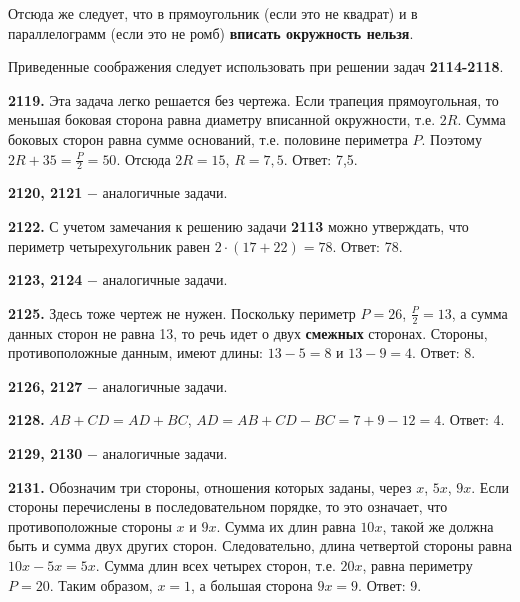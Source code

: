 Отсюда же следует, что в прямоугольник (если это не квадрат) и в параллелограмм (если это не ромб) \textbf{вписать окружность нельзя}.  

Приведенные соображения следует использовать при решении задач \textbf{2114-2118}.

\textbf{2119.} Эта задача легко решается без чертежа. Если трапеция прямоугольная, то меньшая боковая сторона равна диаметру вписанной окружности, т.е. $2R$. Сумма боковых сторон равна сумме оснований, т.е. половине периметра $P$. Поэтому $2R+35=\frac{P}{2}=50$. Отсюда $2R=15$, $R=7,5$. \newline \null \hspace*{\fill} Ответ: 7,5.

\textbf{2120, 2121} $-$ аналогичные задачи.

\textbf{2122.} С учетом замечания к решению задачи \textbf{2113} можно утверждать, что периметр четырехугольник равен $2\cdot(17+22)=78$. \newline \null \hspace*{\fill} Ответ: 78.

\textbf{2123, 2124} $-$ аналогичные задачи.

\textbf{2125.} Здесь тоже чертеж не нужен. Поскольку периметр $P=26$, $\frac{P}{2}=13$, а сумма данных сторон не равна 13, то речь идет о двух \textbf{смежных} сторонах. Стороны, противоположные данным, \clearpage имеют длины: $13-5=8$ и $13-9=4$. \newline \null \hspace*{\fill} Ответ: 8.

\textbf{2126, 2127} $-$ аналогичные задачи.

\textbf{2128.} $AB+CD=AD+BC$, $AD=AB+CD-BC=7+9-12=4.$ \newline \null \hspace*{\fill} Ответ: 4.

\textbf{2129, 2130} $-$ аналогичные задачи.

\textbf{2131.} Обозначим три стороны, отношения которых заданы, через $x$, $5x$, $9x$. Если стороны перечислены в последовательном порядке, то это означает, что противоположные стороны $x$ и $9x$. Сумма их длин равна $10x$, такой же должна быть и сумма двух других сторон. Следовательно, длина четвертой стороны равна $10x-5x=5x$. Сумма длин всех четырех сторон, т.е. $20x$, равна периметру $P=20$. Таким образом, $x=1$, а большая сторона $9x=9$. \newline \null \hspace*{\fill} Ответ: 9.

